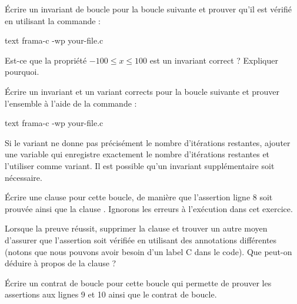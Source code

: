 


Écrire un invariant de boucle pour la boucle suivante et prouver qu'il est vérifié
en utilisant la commande :


\begin{CodeBlock}{text}
frama-c -wp your-file.c
\end{CodeBlock}




Est-ce que la propriété $-100 \leq x \leq 100$ est un invariant correct ?
Expliquer pourquoi.





Écrire un invariant et un variant corrects pour la boucle suivante et prouver
l'ensemble à l'aide de la commande :

\begin{CodeBlock}{text}
frama-c -wp your-file.c
\end{CodeBlock}




Si le variant ne donne pas précisément le nombre d'itérations restantes, ajouter
une variable qui enregistre exactement le nombre d'itérations restantes et l'utiliser
comme variant. Il est possible qu'un invariant supplémentaire soit nécessaire.





Écrire une clause  pour cette boucle, de manière que
l'assertion ligne 8 soit prouvée ainsi que la clause .
Ignorons les erreurs à l'exécution dans cet exercice.





Lorsque la preuve réussit, supprimer la clause  et
trouver un autre moyen d'assurer que l'assertion soit vérifiée en utilisant des
annotations différentes (notons que nous pouvons avoir besoin d'un label C dans
le code). Que peut-on déduire à propos de la clause  ?




Écrire un contrat de boucle pour cette boucle qui permette de prouver les
assertions aux lignes 9 et 10 ainsi que le contrat de boucle.


